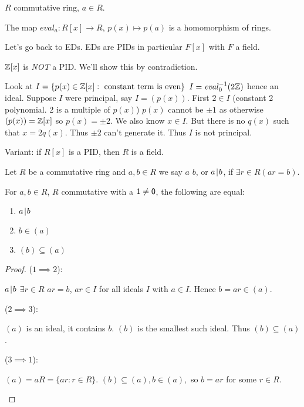 \documentclass[notes.tex]{subfiles}
\begin{document}
\begin{remark}
	$R$ commutative ring, $a\in R$.

	The map $\mathit{eval}_a:R[x]\to R$, $p(x) \mapsto p(a)$ is a homomorphism of rings.
\end{remark}

Let's go back to EDs. EDs are PIDs in particular $F[x]$ with $F$ a field.

\begin{eg}
	$\mathbb{Z}[x]$ is \emph{NOT} a PID. We'll show this by contradiction.

	Look at $I = \{p(x)\in\mathbb{Z}[x] : \text{ constant term is even}\}$ $I = \mathit{eval}_0^{-1}(2\mathbb{Z})$ hence an ideal.
	Suppose $I$ were principal, say $I = (p(x))$. First $2\in I$ (constant 2 polynomial. 2 is a multiple of $p(x)$) $p(x)$ cannot be $\pm 1$ as otherwise $(p(x)) = \mathbb{Z}[x]$ so $p(x) = \pm 2$. We also know $x \in I$. But there is no $q(x)$ such that $x = 2q(x)$. Thus $\pm2$ can't generate it. Thus $I$ is not principal.

	Variant: if $R[x]$ is a PID, then $R$ is a field.
\end{eg}


\begin{defn}
	Let $R$ be a commutative ring and $a,b\in R$ we say $a$  $b$, or $a\mkern2mu|\mkern1mu b$, if $\exists r\in R (ar = b)$.
\end{defn}

\begin{proposition}
	For $a, b\in R$, $R$ commutative with a $\mathsf{1}\ne\mathsf{0}$, the following are equal:
	\begin{enumerate}
		\item $a\mkern2mu|\mkern1mu b$
		\item $b\in (a)$
		\item $(b)\subseteq (a)$
	\end{enumerate}
\end{proposition}

\begin{proof}
	($1\implies 2$):
	\begin{tabin}
		$a\mkern2mu|\mkern1mu b$ $\exists r\in R$ $ar=b$, $ar\in I$ for all ideals $I$ with $a\in I$. Hence $b=ar \in (a)$.
	\end{tabin}
	($2\implies 3$):
	\begin{tabin}
		$(a)$ is an ideal, it contains $b$. $(b)$ is the smallest such ideal. Thus $(b)\subseteq (a)$.
	\end{tabin}
	($3\implies 1$):
	\begin{tabin}
		$(a) = aR = \{ar:r\in R\}$.
		$(b)\subseteq (a), b\in (a),$ so $b=ar$ for some $r\in R$.
	\end{tabin}
\end{proof}
\end{document}
